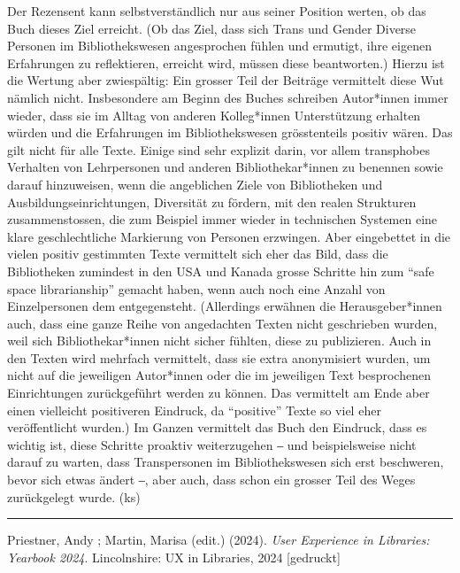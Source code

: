\documentclass[a4paper,
fontsize=11pt,
oneside,
numbers=noperiodatend,
parskip=half-,
bibliography=totoc,
final
]{scrartcl}
\begin{document}
Der Rezensent kann selbstverständlich nur aus seiner Position werten, ob
das Buch dieses Ziel erreicht. (Ob das Ziel, dass sich Trans und Gender
Diverse Personen im Bibliothekswesen angesprochen fühlen und ermutigt,
ihre eigenen Erfahrungen zu reflektieren, erreicht wird, müssen diese
beantworten.) Hierzu ist die Wertung aber zwiespältig: Ein grosser Teil
der Beiträge vermittelt diese Wut nämlich nicht. Insbesondere am Beginn
des Buches schreiben Autor*innen immer wieder, dass sie im Alltag von
anderen Kolleg*innen Unterstützung erhalten würden und die Erfahrungen
im Bibliothekswesen grösstenteils positiv wären. Das gilt nicht für alle
Texte. Einige sind sehr explizit darin, vor allem transphobes Verhalten
von Lehrpersonen und anderen Bibliothekar*innen zu benennen sowie darauf
hinzuweisen, wenn die angeblichen Ziele von Bibliotheken und
Ausbildungseinrichtungen, Diversität zu fördern, mit den realen
Strukturen zusammenstossen, die zum Beispiel immer wieder in technischen
Systemen eine klare geschlechtliche Markierung von Personen erzwingen.
Aber eingebettet in die vielen positiv gestimmten Texte vermittelt sich
eher das Bild, dass die Bibliotheken zumindest in den USA und Kanada
grosse Schritte hin zum \enquote{safe space librarianship} gemacht
haben, wenn auch noch eine Anzahl von Einzelpersonen dem entgegensteht.
(Allerdings erwähnen die Herausgeber*innen auch, dass eine ganze Reihe
von angedachten Texten nicht geschrieben wurden, weil sich
Bibliothekar*innen nicht sicher fühlten, diese zu publizieren. Auch in
den Texten wird mehrfach vermittelt, dass sie extra anonymisiert wurden,
um nicht auf die jeweiligen Autor*innen oder die im jeweiligen Text
besprochenen Einrichtungen zurückgeführt werden zu können. Das
vermittelt am Ende aber einen vielleicht positiveren Eindruck, da
\enquote{positive} Texte so viel eher veröffentlicht wurden.) Im Ganzen
vermittelt das Buch den Eindruck, dass es wichtig ist, diese Schritte
proaktiv weiterzugehen ‒ und beispielsweise nicht darauf zu warten, dass
Transpersonen im Bibliothekswesen sich erst beschweren, bevor sich etwas
ändert ‒, aber auch, dass schon ein grosser Teil des Weges zurückgelegt
wurde. (ks)

\begin{center}\rule{0.5\linewidth}{0.5pt}\end{center}

Priestner, Andy ; Martin, Marisa (edit.) (2024). \emph{User Experience
in Libraries: Yearbook 2024}. Lincolnshire: UX in Libraries, 2024
{[}gedruckt{]}
\end{document}
